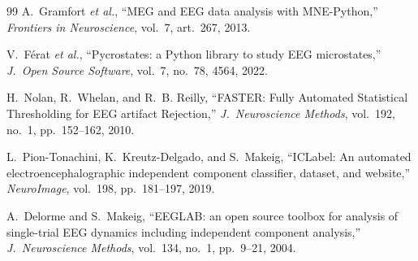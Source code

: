 \documentclass[11pt,a4paper]{article}
\begin{document}
\begin{thebibliography}{99}
 A.~Gramfort \emph{et al.}, ``MEG and EEG data analysis with MNE-Python,'' \emph{Frontiers in Neuroscience}, vol.~7, art.~267, 2013.

 V.~F\'erat \emph{et al.}, ``Pycrostates: a Python library to study EEG microstates,'' \emph{J.\ Open Source Software}, vol.~7, no.~78, 4564, 2022.

 H.~Nolan, R.~Whelan, and R.~B. Reilly, ``FASTER: Fully Automated Statistical Thresholding for EEG artifact Rejection,'' \emph{J.\ Neuroscience Methods}, vol.~192, no.~1, pp.~152--162, 2010.

 L.~Pion-Tonachini, K.~Kreutz-Delgado, and S.~Makeig, ``ICLabel: An automated electroencephalographic independent component classifier, dataset, and website,'' \emph{NeuroImage}, vol.~198, pp.~181--197, 2019.

 A.~Delorme and S.~Makeig, ``EEGLAB: an open source toolbox for analysis of single-trial EEG dynamics including independent component analysis,'' \emph{J.\ Neuroscience Methods}, vol.~134, no.~1, pp.~9--21, 2004.

\end{thebibliography}
\end{document}
